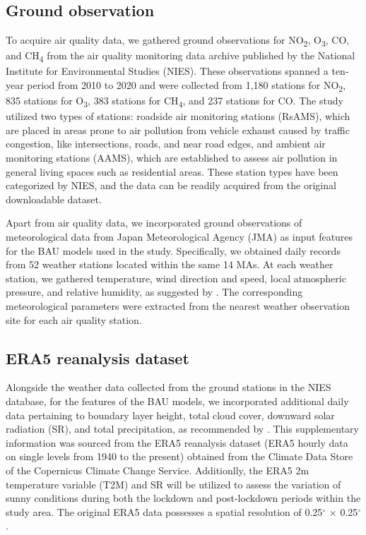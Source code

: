 \subsection{Ground observation}
To acquire air quality data, we gathered ground observations for NO\textsubscript{2}, O\textsubscript{3}, CO, and CH\textsubscript{4} from the air quality monitoring data archive published by the National Institute for Environmental Studies (NIES). These observations spanned a ten-year period from 2010 to 2020 and were collected from 1,180 stations for NO\textsubscript{2}, 835 stations for O\textsubscript{3}, 383 stations for CH\textsubscript{4}, and 237 stations for CO. The study utilized two types of stations: roadside air monitoring stations (RsAMS), which are placed in areas prone to air pollution from vehicle exhaust caused by traffic congestion, like intersections, roads, and near road edges, and ambient air monitoring stations (AAMS), which are established to assess air pollution in general living spaces such as residential areas. These station types have been categorized by NIES, and the data can be readily acquired from the original downloadable dataset. \par
Apart from air quality data, we incorporated ground observations of meteorological data from Japan Meteorological Agency (JMA) as input features for the BAU models used in the study. Specifically, we obtained daily records from 52 weather stations located within the same 14 MAs. At each weather station, we gathered temperature, wind direction and speed, local atmospheric pressure, and relative humidity, as suggested by \citep{grange2021covid}. The corresponding meteorological parameters were extracted from the nearest weather observation site for each air quality station.\par

\subsection{ERA5 reanalysis dataset}
Alongside the weather data collected from the ground stations in the NIES database, for the features of the BAU models, we incorporated additional daily data pertaining to boundary layer height, total cloud cover, downward solar radiation (SR), and total precipitation, as recommended by \citep{shi2021abrupt}. This supplementary information was sourced from the ERA5 reanalysis dataset (ERA5 hourly data on single levels from 1940 to the present) obtained from the Climate Data Store of the Copernicus Climate Change Service. Additionlly, the ERA5 2m temperature variable (T2M) and SR will be utilized to assess the variation of sunny conditions during both the lockdown and post-lockdown periods within the study area. The original ERA5 data possesses a spatial resolution of 0.25$^{\circ}$ $\times$ 0.25$^{\circ}$ .\par
